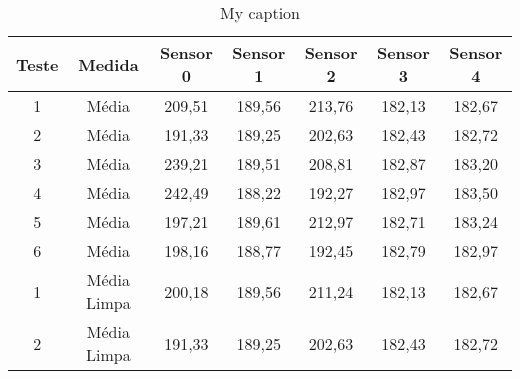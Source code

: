 \begin{table}[]
\centering
\caption{My caption}
\label{my-label}
\begin{tabular}{|c|c|ccccc|}
\hline
\textbf{Teste}            & \textbf{Medida}                                                            & \textbf{Sensor 0}          & \textbf{Sensor 1}          & \textbf{Sensor 2}          & \textbf{Sensor 3}          & \textbf{Sensor 4}           \\ \hline
1                         & Média                                                                      & 209,51                     & 189,56                     & 213,76                     & 182,13                     & 182,67                      \\
2                         & Média                                                                      & 191,33                     & 189,25                     & 202,63                     & 182,43                     & 182,72                      \\
3                         & Média                                                                      & 239,21                     & 189,51                     & 208,81                     & 182,87                     & 183,20                      \\
4                         & Média                                                                      & 242,49                     & 188,22                     & 192,27                     & 182,97                     & 183,50                      \\
5                         & Média                                                                      & 197,21                     & 189,61                     & 212,97                     & 182,71                     & 183,24                      \\
6                         & Média                                                                      & 198,16                     & 188,77                     & 192,45                     & 182,79                     & 182,97                      \\ \hline
1                         & Média Limpa                                                                & 200,18                     & 189,56                     & 211,24                     & 182,13                     & 182,67                      \\
2                         & Média Limpa                                                                & 191,33                     & 189,25                     & 202,63                     & 182,43                     & 182,72                      \\

\end{tabular}
\end{table}
